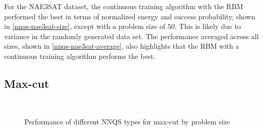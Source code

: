 For the NAE3SAT dataset, the continuous training algorithm with the RBM performed the best in terms of normalized energy and success probability, shown in \autoref{nnqs-nae3sat-size}, except with a problem size of $50$. This is likely due to variance in the randomly generated data set. The performance averaged across all sizes, shown in \autoref{nnqs-nae3sat-average}, also highlights that the RBM with a continuous training algorithm performs the best.

\subsection{Max-cut}

\begin{figure}[!htbp]
    \\
    \caption{Performance of different NNQS types for max-cut by problem size}
    \label{nnqs-maxcut-size}
\end{figure}

